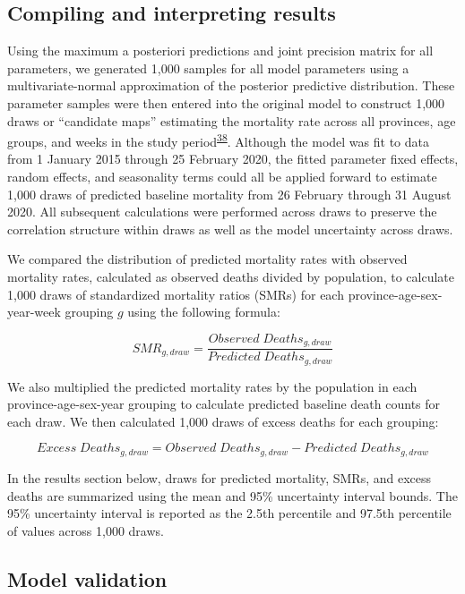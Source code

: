 \documentclass[
]{article}
\begin{document}
\hypertarget{compiling-and-interpreting-results}{%
\subsection{Compiling and interpreting results}\label{compiling-and-interpreting-results}}

Using the maximum a posteriori predictions and joint precision matrix for all parameters, we generated 1,000 samples for all model parameters using a multivariate-normal approximation of the posterior predictive distribution. These parameter samples were then entered into the original model to construct 1,000 draws or ``candidate maps'' estimating the mortality rate across all provinces, age groups, and weeks in the study period\textsuperscript{\protect\hyperlink{ref-Patil2011}{38}}⁠. Although the model was fit to data from 1 January 2015 through 25 February 2020, the fitted parameter fixed effects, random effects, and seasonality terms could all be applied forward to estimate 1,000 draws of predicted baseline mortality from 26 February through 31 August 2020. All subsequent calculations were performed across draws to preserve the correlation structure within draws as well as the model uncertainty across draws.

We compared the distribution of predicted mortality rates with observed mortality rates, calculated as observed deaths divided by population, to calculate 1,000 draws of standardized mortality ratios (SMRs) for each province-age-sex-year-week grouping \(g\) using the following formula:

\[SMR_{g,draw} = \frac{Observed\;Deaths_{g,draw}}{Predicted\;Deaths_{g,draw}}\]

We also multiplied the predicted mortality rates by the population in each province-age-sex-year grouping to calculate predicted baseline death counts for each draw. We then calculated 1,000 draws of excess deaths for each grouping:

\[Excess\;Deaths_{g,draw}=Observed\;Deaths_{g,draw}-Predicted\;Deaths_{g,draw}\]

In the results section below, draws for predicted mortality, SMRs, and excess deaths are summarized using the mean and 95\% uncertainty interval bounds. The 95\% uncertainty interval is reported as the 2.5th percentile and 97.5th percentile of values across 1,000 draws.

\hypertarget{model-validation}{%
\subsection{Model validation}\label{model-validation}}
\end{document}
